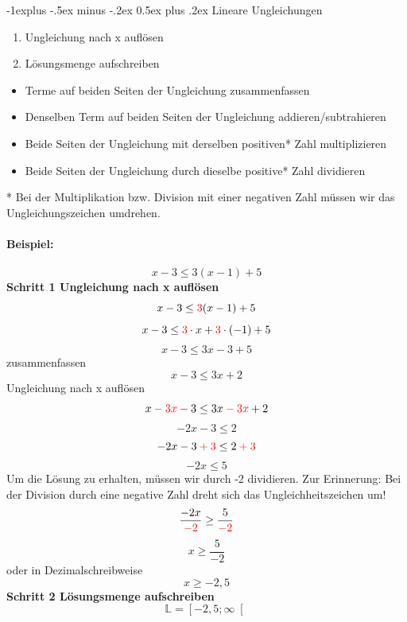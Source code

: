 \documentclass[a4paper,10pt]{article}
\makeatletter
\renewcommand{\subsection}{\@startsection{subsection}{2}{0mm}%
                                {-1explus -.5ex minus -.2ex}%
                                {0.5ex plus .2ex}%
                                {\normalfont\normalsize\bfseries}}
\makeatother
\begin{document}
\begin{multicols}{3}
    \subsection{Lineare Ungleichungen}
    \begin{enumerate}
        \item Ungleichung nach x auflösen
        \item Lösungsmenge aufschreiben
    \end{enumerate}
    \begin{itemize}
        \item Terme auf beiden Seiten der Ungleichung zusammenfassen
        \item Denselben Term auf beiden Seiten der Ungleichung addieren/subtrahieren
        \item Beide Seiten der Ungleichung mit derselben positiven* Zahl multiplizieren
        \item Beide Seiten der Ungleichung durch dieselbe positive* Zahl dividieren
    \end{itemize}
    * Bei der Multiplikation bzw. Division mit einer negativen Zahl müssen wir das Ungleichungszeichen umdrehen.\\~\\
    \textbf{Beispiel:}\\~\\
    \[x - 3 \leq 3 (x-1) + 5\]
    \textbf{Schritt 1 Ungleichung nach x auflösen}\\
    \[x - 3 \leq {\color{red}3} (x-1) + 5\]
    \[x - 3 \leq {\color{red}3} \cdot x + {\color{red}3} \cdot (-1) + 5\]
    \[x - 3 \leq 3x - 3 + 5\]
    zusammenfassen
    \[x - 3 \leq 3x + 2\]
    Ungleichung nach x auflösen
    \[x {\color{red}\:-\:3x} - 3 \leq 3x {\color{red}\:-\:3x} + 2\]
    \[-2x - 3 \leq 2\]
    \[-2x - 3 {\color{red}\:+\:3} \leq 2 {\color{red}\:+\:3}\]
    \[-2x \leq 5\]
    Um die Lösung zu erhalten, müssen wir durch -2 dividieren.
    Zur Erinnerung: Bei der Division durch eine negative Zahl dreht sich das Ungleichheitszeichen um!
    \[\frac{-2x}{{\color{red}-2}} \geq \frac{5}{{\color{red}-2}}\]
    \[x \geq \frac{5}{-2}\]
    oder in Dezimalschreibweise
    \[x \geq -2{,}5\]
    \textbf{Schritt 2 Lösungsmenge aufschreiben}\\
    \[\mathbb{L} = \left[-2{,}5;\infty\right[\]

\end{multicols}
\end{document}
